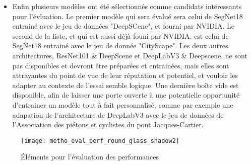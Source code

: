\begin{itemize}
    \item Enfin plusieurs modèles ont été sélectionnés comme candidats intéressants pour l'évluation. Le premier modèle qui sera évalué sera celui de SegNet18 entrainé avec le jeu de données "DeepSCene", et fourni par NVIDIA. Le second de la liste, et qui est aussi déjà founi par NVIDIA, est celui de SegNet18 entrainé avec le jeu de donnée "CityScape". Les deux autres architectures, ResNet101 \& DeepScene et DeepLabV3 \& Deepscene, ne sont pas disponibles et devront être préparées et entrainées, mais elles sont attrayantes du point de vue de leur réputation et potentiel, et vouloir les adapter au contexte de l'essai semble logique. Une dernière boîte vide est disponible, afin de laisser une porte ouverte à une potentielle opportunité d'entrainer un modèle tout à fait personnalisé, comme par exemple une adapation de l'architecture de DeepLabV3 avec le jeu de données de l'Association des piétons et cyclistes du pont Jacques-Cartier.
\end{itemize} 
\label{metho_eval}
\begin{figure}[H]
    \centering
    \texttt{[image: metho\_eval\_perf\_round\_glass\_shadow2]}
    \caption{Éléments pour l'évaluation des performances}
    \label{fig:metho_eval}
\end{figure}
